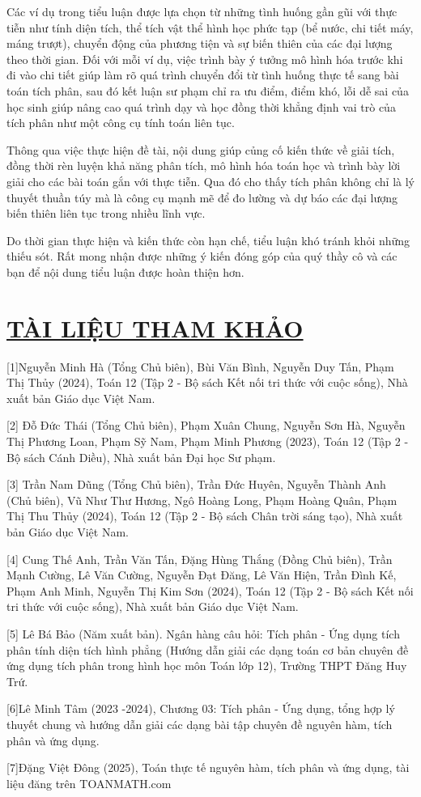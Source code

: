 \documentclass[12pt,a4paper,oneside]{book}
\theoremstyle{theorem}
\theoremstyle{definition}
\begin{document}
Các ví dụ trong tiểu luận được lựa chọn từ những tình huống gần gũi với thực tiễn như tính diện tích, thể tích vật thể hình học phức tạp (bể nước, chi tiết máy, máng trượt), chuyển động của phương tiện và sự biến thiên của các đại lượng theo thời gian. Đối với mỗi ví dụ, việc trình bày ý tưởng mô hình hóa trước khi đi vào chi tiết giúp làm rõ quá trình chuyển đổi từ tình huống thực tế sang bài toán tích phân, sau đó kết luận sư phạm chỉ ra ưu điểm, điểm khó, lỗi dễ sai của học sinh giúp nâng cao quá trình dạy và học đồng thời khẳng định vai trò của tích phân như một công cụ tính toán liên tục.

Thông qua việc thực hiện đề tài, nội dung giúp củng cố kiến thức về giải tích, đồng thời rèn luyện khả năng phân tích, mô hình hóa toán học và trình bày lời giải cho các bài toán gắn với thực tiễn. Qua đó cho thấy tích phân không chỉ là lý thuyết thuần túy mà là công cụ mạnh mẽ để đo lường và dự báo các đại lượng biến thiên liên tục trong nhiều lĩnh vực.

Do thời gian thực hiện và kiến thức còn hạn chế, tiểu luận khó tránh khỏi những thiếu sót. Rất mong nhận được những ý kiến đóng góp của quý thầy cô và các bạn để nội dung tiểu luận được hoàn thiện hơn.
    \chapter*{\underline{TÀI LIỆU THAM KHẢO}}
     [1]Nguyễn Minh Hà (Tổng Chủ biên), Bùi Văn Bình, Nguyễn Duy Tấn, Phạm Thị Thủy (2024), Toán 12 (Tập 2 - Bộ sách Kết nối tri thức với cuộc sống), Nhà xuất bản Giáo dục Việt Nam.
     
     [2] Đỗ Đức Thái (Tổng Chủ biên), Phạm Xuân Chung, Nguyễn Sơn Hà, Nguyễn Thị Phương Loan, Phạm Sỹ Nam, Phạm Minh Phương (2023), Toán 12 (Tập 2 - Bộ sách Cánh Diều), Nhà xuất bản Đại học Sư phạm.
     
    [3] Trần Nam Dũng (Tổng Chủ biên), Trần Đức Huyên, Nguyễn Thành Anh (Chủ biên), Vũ Như Thư Hương, Ngô Hoàng Long, Phạm Hoàng Quân, Phạm Thị Thu Thủy (2024), Toán 12 (Tập 2 - Bộ sách Chân trời sáng tạo), Nhà xuất bản Giáo dục Việt Nam.
    
    [4] Cung Thế Anh, Trần Văn Tấn, Đặng Hùng Thắng (Đồng Chủ biên), Trần Mạnh Cường, Lê Văn Cường, Nguyễn Đạt Đăng, Lê Văn Hiện, Trần Đình Kế, Phạm Anh Minh, Nguyễn Thị Kim Sơn (2024), Toán 12 (Tập 2 - Bộ sách Kết nối tri thức với cuộc sống), Nhà xuất bản Giáo dục Việt Nam.
    
    [5] Lê Bá Bảo (Năm xuất bản). Ngân hàng câu hỏi: Tích phân - Ứng dụng tích phân tính diện tích hình phẳng (Hướng dẫn giải các dạng toán cơ bản chuyên đề ứng dụng tích phân trong hình học môn Toán lớp 12), Trường THPT Đăng Huy Trứ.
    
    [6]Lê Minh Tâm (2023 -2024), Chương 03: Tích phân - Ứng dụng, tổng hợp lý thuyết chung và hướng dẫn giải các dạng bài tập chuyên đề nguyên hàm, tích phân và ứng dụng.

    [7]Đặng Việt Đông (2025), Toán thực tế nguyên hàm, tích phân và ứng dụng, tài liệu đăng trên TOANMATH.com
 
\end{document}

